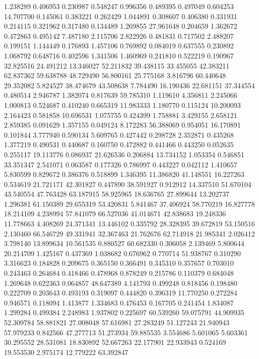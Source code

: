 1.238289
0.406953
0.230987
0.548247
0.996356
0.489395
0.497049
0.604253
14.707700
0.145061
0.383221
0.262429
1.044891
0.308607
0.406380
0.331931
0.214115
0.321962
0.317480
0.134489
1.269855
27.961648
0.204659
1.362672
0.472863
0.495142
7.487180
2.115706
2.822926
0.481831
0.717502
2.488207
0.199151
1.144449
0.176893
1.457106
0.769892
0.084019
0.637555
0.230892
1.068792
0.648716
0.402596
1.341506
1.460969
0.241810
0.522219
0.190967
32.825516
24.491212
13.346027
52.211832
39.438115
33.455055
42.383211
62.837362
59.638788
48.729490
56.800161
25.775168
3.816796
60.440648
29.352082
5.824527
38.474679
43.508638
7.784490
16.190436
22.681151
37.344554
0.480514
2.946787
1.382074
0.817639
59.785310
1.119610
4.356811
2.245066
1.000813
0.524687
0.410240
0.665319
11.983333
1.180770
0.115124
10.200093
2.164423
0.581858
10.696531
1.075755
0.424399
1.758881
3.429155
2.658121
2.859385
0.091629
1.357155
0.049124
8.172283
56.388069
0.954051
16.170891
0.101844
3.777940
0.590134
5.609765
0.427442
0.298728
2.352871
0.435268
1.377219
0.490531
0.440687
0.160750
0.472882
0.441466
0.443250
0.052635
0.255117
19.113776
0.086937
21.626536
0.206884
13.734152
1.053354
0.546851
33.351347
2.541071
0.063587
0.177326
0.786997
0.443227
0.042112
1.410657
5.830599
0.829672
0.386376
0.518899
1.346395
11.386820
41.148551
16.227263
0.534619
21.721171
42.301827
0.447890
38.591927
0.912912
14.337510
51.670104
43.540554
47.763428
63.187915
58.925965
18.636765
27.899644
13.202737
1.296381
61.150389
29.655319
53.420831
5.841467
37.406924
58.770219
16.827778
18.214109
4.238994
57.841079
66.527036
41.014671
42.838683
19.248336
11.778663
4.408269
24.371341
13.446102
0.335792
28.328395
39.672819
53.150516
2.130460
66.546729
49.331941
32.367463
21.762676
62.714918
21.985341
2.026412
3.798140
13.899634
10.561535
0.880527
60.682330
0.306058
2.139469
5.800644
20.214709
1.425167
0.437369
1.038682
0.676962
0.770714
51.938767
0.310290
3.316623
0.184828
0.209675
0.365150
0.366491
0.345310
0.357657
0.703010
0.243463
0.264684
0.418466
0.478968
0.878249
0.215786
0.110379
0.684048
1.269648
0.622363
0.064857
48.647389
4.141793
0.499248
0.818456
0.198480
0.222709
0.203643
0.493193
0.319097
0.444820
0.396319
11.770250
0.272284
0.946571
0.118094
1.413877
1.334683
0.476453
0.167705
0.241454
1.834087
1.299284
0.499384
2.248983
1.937802
0.225697
60.539260
59.075791
44.909935
52.309784
58.881821
27.008048
57.616981
27.283249
51.127243
21.940943
57.979233
0.842566
47.277713
51.273934
59.885535
3.554686
5.601065
5.603361
30.295552
28.531081
18.830892
52.667263
22.177901
22.933943
0.524169
19.553530
2.975174
12.779222
63.392847
